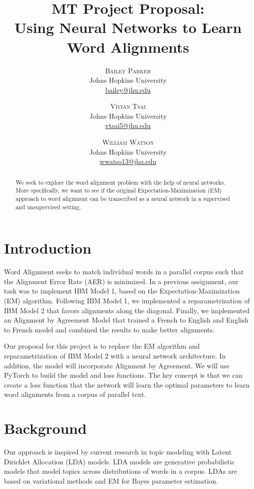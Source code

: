 \documentclass[twoside,twocolumn]{article}
\title{MT Project Proposal: \\ Using Neural Networks to Learn Word Alignments}
\author{%
\textsc{Bailey Parker} \\[1ex]
\normalsize Johns Hopkins University \\
\normalsize \href{mailto:bailey@jhu.edu}{bailey@jhu.edu}
 \and
 \textsc{Vivian Tsai} \\[1ex]
\normalsize Johns Hopkins University \\
\normalsize \href{mailto:vtsai5@jhu.edu}{vtsai5@jhu.edu}
 \and
  \textsc{William Watson} \\[1ex]
\normalsize Johns Hopkins University \\
\normalsize \href{mailto:wwatso13@jhu.edu}{wwatso13@jhu.edu}
}
\date{}%
\begin{document}
\maketitle





\begin{abstract}
We seek to explore the word alignment problem with the help of neural networks. More specifically, we want to see if the original Expectation-Maximization (EM) approach to word alignment can be transcribed as a neural network in a supervised and unsupervised setting.
\end{abstract}


\section{Introduction}
Word Alignment seeks to match individual words in a parallel corpus such that the Alignment Error Rate (AER) is minimized. In a previous assignment, our task was to implement IBM Model 1, based on the Expectation-Maximization (EM) algorithm. Following IBM Model 1, we implemented a reparametrization of IBM Model 2 that favors alignments along the diagonal. Finally, we implemented an Alignment by Agreement Model that trained a French to English and English to French model and combined the results to make better alignments.

Our proposal for this project is to replace the EM algorithm and reparametrization of IBM Model 2 with a neural network architecture. In addition, the model will incorporate Alignment by Agreement. We will use PyTorch to build the model and loss functions. The key concept is that we can create a loss function that the network will learn the optimal parameters to learn word alignments from a corpus of parallel text.


\section{Background}
Our approach is inspired by current research in topic modeling with Latent Dirichlet Allocation (LDA) models. LDA models are generative probabilistic models that model topics across distributions of words in a corpus. LDAs are based on variational methods and EM for Bayes parameter estimation.
\end{document}
